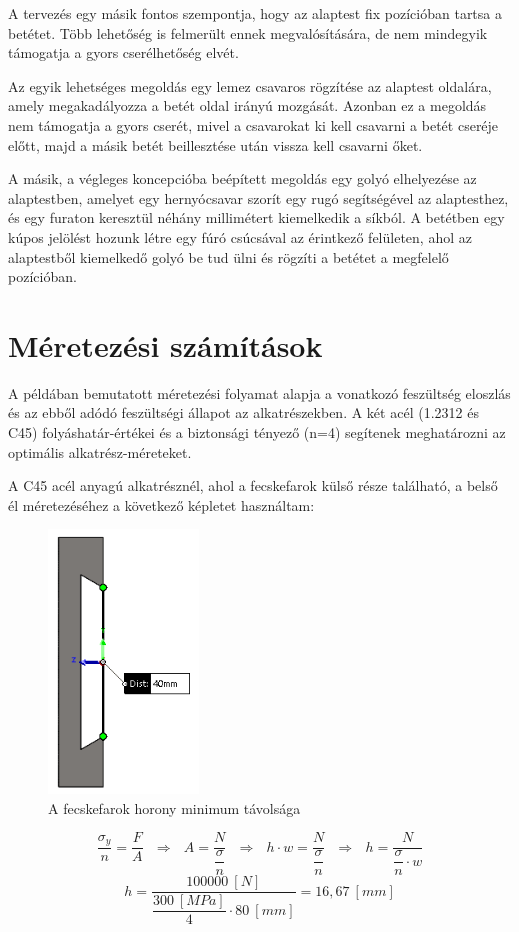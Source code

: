 \documentclass[12pt,a4paper,oneside]{report}
\begin{document}
A tervezés egy másik fontos szempontja, hogy az alaptest fix pozícióban tartsa a betétet. Több lehetőség is felmerült ennek megvalósítására, de nem mindegyik támogatja a gyors cserélhetőség elvét.

Az egyik lehetséges megoldás egy lemez csavaros rögzítése az alaptest oldalára, amely megakadályozza a betét oldal irányú mozgását. Azonban ez a megoldás nem támogatja a gyors cserét, mivel a csavarokat ki kell csavarni a betét cseréje előtt, majd a másik betét beillesztése után vissza kell csavarni őket.

A másik, a végleges koncepcióba beépített megoldás egy golyó elhelyezése az alaptestben, amelyet egy hernyócsavar szorít egy rugó segítségével az alaptesthez, és egy furaton keresztül néhány millimétert kiemelkedik a síkból. A betétben egy kúpos jelölést hozunk létre egy fúró csúcsával az érintkező felületen, ahol az alaptestből kiemelkedő golyó be tud ülni és rögzíti a betétet a megfelelő pozícióban.

\section{Méretezési számítások}
A példában bemutatott méretezési folyamat alapja a vonatkozó feszültség eloszlás és az ebből adódó feszültségi állapot az alkatrészekben. A két acél (1.2312 és C45) folyáshatár-értékei és a biztonsági tényező (n=4) segítenek meghatározni az optimális alkatrész-méreteket.

A C45 acél anyagú alkatrésznél, ahol a fecskefarok külső része található, a belső él méretezéséhez a következő képletet használtam:

\begin{figure}[H]
\centering
\includegraphics[width=4cm]{figures/fecske_belso}
\caption{A fecskefarok horony minimum távolsága}
\label{Fig:fecske_belso}
\end{figure}
\begin{equation}
\dfrac{\sigma_y}{n}=\dfrac{F}{A}\ \ \ \Rightarrow\ \ \ A=\dfrac{N}{\dfrac{\sigma}{n}}\ \ \ \Rightarrow\ \ \ h\cdot w=\dfrac{N}{\dfrac{\sigma}{n}}\ \ \ \Rightarrow\ \ \ h=\dfrac{N}{\dfrac{\sigma}{n}\cdot w}
\end{equation}
\begin{equation*}\label{Eq:fecske_belso}
h=\dfrac{100000\ [N]}{\dfrac{300\ [MPa]}{4}\cdot 80\ [mm]}=16,67\ [mm]
\end{equation*}
\end{document}

